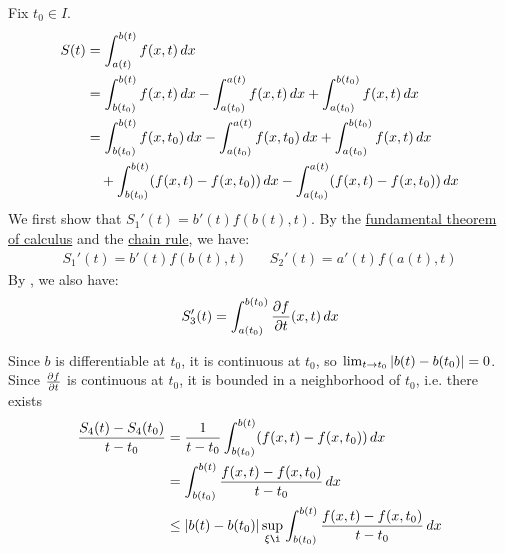 \documentclass[main.tex]{subfiles}
\begin{document}
Fix $t_0\in I$.
\begin{align*}
    S(t)
    &= \int_{a(t)}^{b(t)} f(x,t)\,dx \\
    &= \int_{b(t_0)}^{b(t)} f(x,t)\,dx - \int_{a(t_0)}^{a(t)} f(x,t)\,dx + \int_{a(t_0)}^{b(t_0)} f(x,t)\,dx \\
    &= \int_{b(t_0)}^{b(t)} f(x,t_0)\,dx - \int_{a(t_0)}^{a(t)} f(x,t_0)\,dx + \int_{a(t_0)}^{b(t_0)} f(x,t)\,dx \\
    &\quad + \int_{b(t_0)}^{b(t)} (f(x,t)-f(x,t_0))\,dx - \int_{a(t_0)}^{a(t)} (f(x,t)-f(x,t_0))\,dx \\
\end{align*}
We first show that $S_1'(t)=b'(t)f(b(t),t)$. By the \href{https://en.wikipedia.org/wiki/Fundamental_theorem_of_calculus}{fundamental theorem of calculus} and the \href{https://en.wikipedia.org/wiki/Chain_rule}{chain rule}, we have:
\begin{align*}
    S_1'(t) = b'(t)f(b(t),t) && S_2'(t) = a'(t)f(a(t),t)
\end{align*}
By , we also have:
\begin{align*}
    S_3'(t) = \int_{a(t_0)}^{b(t_0)} \pdv{f}{t}\/(x,t)\,dx
\end{align*}

Since $b$ is differentiable at $t_0$, it is continuous at $t_0$, so $\lim_{t\to t_0} \abs{b(t)-b(t_0)}=0$. Since $\pdv{f}{t}$ is continuous at $t_0$, it is bounded in a neighborhood of $t_0$, i.e. there exists
\begin{align*}
    \frac{S_4(t)-S_4(t_0)}{t-t_0}
    &= \frac{1}{t-t_0}\int_{b(t_0)}^{b(t)} (f(x,t)-f(x,t_0))\dx \\
    &= \int_{b(t_0)}^{b(t)} \frac{f(x,t)-f(x,t_0)}{t-t_0}\dx \\
    &\le \abs{b(t)-b(t_0)}\sup_{\xi\i} \int_{b(t_0)}^{b(t)} \frac{f(x,t)-f(x,t_0)}{t-t_0}\dx \\
\end{align*}
\end{document}
